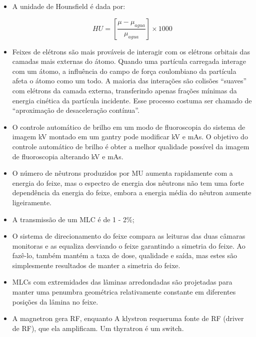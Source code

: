 \documentclass[11pt,a4paper]{article}
\newcounter{exemplo}
\begin{document}
\begin{exemplo}[Física]
\begin{itemize}
        \item A unidade de Hounsfield é dada por:
        
            \begin{equation*}
                HU = \left[\frac{\mu - \mu_{agua}}{\mu_{agua}}\right] \times 1000
            \end{equation*}
        \item Feixes de elétrons são mais prováveis de interagir com os elétrons orbitais das camadas mais externas do átomo. Quando uma partícula carregada interage com um átomo, a influência do campo de força coulombiano da partícula afeta o átomo como um todo. A maioria das interações são colisões “suaves” com elétrons da camada externa, transferindo apenas frações mínimas da energia cinética da partícula incidente. Esse processo costuma ser chamado de “aproximação de desaceleração contínua”.
        
        \item O controle automático de brilho em um modo de fluoroscopia do sistema de imagem kV montado em um gantry pode modificar kV e mAs. O objetivo do controle automático de brilho é obter a melhor qualidade possível da imagem de fluoroscopia alterando kV e mAs.
        
        \item O número de nêutrons produzidos por MU aumenta rapidamente com a energia do feixe, mas o espectro de energia dos nêutrons não tem uma forte dependência da energia do feixe, embora a energia média do nêutron aumente ligeiramente.
        
        \item A transmissão de um MLC é de 1 - 2\%; 
        
        \item O sistema de direcionamento do feixe compara as leituras das duas câmaras monitoras e as equaliza desviando o feixe garantindo a simetria do feixe. Ao fazê-lo, também mantém a taxa de dose, qualidade e saída, mas estes são simplesmente resultados de manter a simetria do feixe.
        
        \item MLCs com extremidades das lâminas arredondadas são projetadas para manter uma penumbra geométrica relativamente constante em diferentes posições da lâmina no feixe.
        
        \item A magnetron gera RF, enquanto A klystron requeruma fonte de RF (driver de RF), que ela amplificam. Um thyratron é um switch.
        

\end{itemize}
\end{exemplo}
\end{document}
